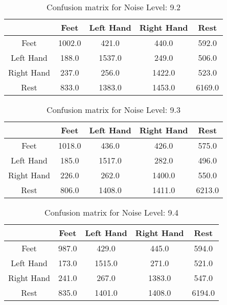 \begin{table}[!htbp]
    \centering
    \begin{tabular}{|c||c|c|c|c|}
        \hline
		 & Feet & Left Hand & Right Hand & Rest \\
        \hline
        \hline
        Feet & 1002.0 & 421.0 & 440.0 & 592.0 \\
        \hline
        Left Hand & 188.0 & 1537.0 & 249.0 & 506.0 \\
        \hline
        Right Hand & 237.0 & 256.0 & 1422.0 & 523.0 \\
        \hline
        Rest & 833.0 & 1383.0 & 1453.0 & 6169.0 \\
        \hline
    \end{tabular}
    \caption{Confusion matrix for Noise Level: 9.2}
\end{table}

\begin{table}[!htbp]
    \centering
    \begin{tabular}{|c||c|c|c|c|}
        \hline
		 & Feet & Left Hand & Right Hand & Rest \\
        \hline
        \hline
        Feet & 1018.0 & 436.0 & 426.0 & 575.0 \\
        \hline
        Left Hand & 185.0 & 1517.0 & 282.0 & 496.0 \\
        \hline
        Right Hand & 226.0 & 262.0 & 1400.0 & 550.0 \\
        \hline
        Rest & 806.0 & 1408.0 & 1411.0 & 6213.0 \\
        \hline
    \end{tabular}
    \caption{Confusion matrix for Noise Level: 9.3}
\end{table}

\begin{table}[!htbp]
    \centering
    \begin{tabular}{|c||c|c|c|c|}
        \hline
		 & Feet & Left Hand & Right Hand & Rest \\
        \hline
        \hline
        Feet & 987.0 & 429.0 & 445.0 & 594.0 \\
        \hline
        Left Hand & 173.0 & 1515.0 & 271.0 & 521.0 \\
        \hline
        Right Hand & 241.0 & 267.0 & 1383.0 & 547.0 \\
        \hline
        Rest & 835.0 & 1401.0 & 1408.0 & 6194.0 \\
        \hline
    \end{tabular}
    \caption{Confusion matrix for Noise Level: 9.4}
\end{table}

